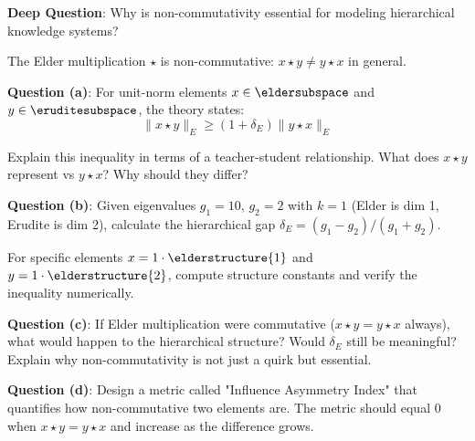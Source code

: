 \documentclass[12pt,a4paper]{article}
\theoremstyle{definition}
\theoremstyle{remark}
\begin{document}
\begin{tcolorbox}[colback=orange!5,colframe=orange!70!black,title=Critical Thinking Question 2,fonttitle=\bfseries]
\textbf{Deep Question}: Why is non-commutativity essential for modeling hierarchical knowledge systems?

The Elder multiplication $\star$ is non-commutative: $x \star y \neq y \star x$ in general.

\textbf{Question (a)}: For unit-norm elements $x \in \eldersubspace$ and $y \in \eruditesubspace$, the theory states:
$$\|x \star y\|_E \geq (1 + \delta_E) \|y \star x\|_E$$

Explain this inequality in terms of a teacher-student relationship. What does $x \star y$ represent vs $y \star x$? Why should they differ?

\textbf{Question (b)}: Given eigenvalues $g_1 = 10$, $g_2 = 2$ with $k=1$ (Elder is dim 1, Erudite is dim 2), calculate the hierarchical gap $\delta_E = (g_1 - g_2)/(g_1 + g_2)$.  

For specific elements $x = 1 \cdot \elderstructure{1}$ and $y = 1 \cdot \elderstructure{2}$, compute structure constants and verify the inequality numerically.

\textbf{Question (c)}: If Elder multiplication were commutative ($x \star y = y \star x$ always), what would happen to the hierarchical structure? Would $\delta_E$ still be meaningful? Explain why non-commutativity is not just a quirk but essential.

\textbf{Question (d)}: Design a metric called "Influence Asymmetry Index" that quantifies how non-commutative two elements are. The metric should equal 0 when $x \star y = y \star x$ and increase as the difference grows.
\end{tcolorbox}
\end{document}
